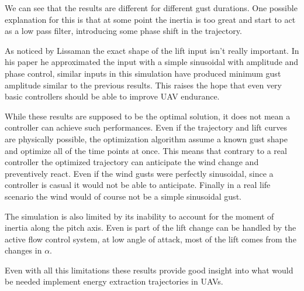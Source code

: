 \FloatBarrier

\par We can see that the results are different for different gust durations.
One possible explanation for this is that at some point the inertia is too great and start to act as a low pass filter, introducing some phase shift in the trajectory. 





\par As noticed by Lissaman the exact shape of the lift input isn't really important.
In his paper he approximated the input with a simple sinusoidal with amplitude and phase control, similar inputs in this simulation have produced minimum gust amplitude similar to the previous results.
This raises the hope that even very basic controllers should be able to improve UAV endurance.


\par While these results are supposed to be the optimal solution, it does not mean a controller can achieve such performances.
Even if the trajectory and lift curves are physically possible, the optimization algorithm assume a known gust shape and optimize all of the time points at once.
This means that contrary to a real controller the optimized trajectory can anticipate the wind change and preventively react.
Even if the wind gusts were perfectly sinusoidal, since a controller is casual it would not be able to anticipate.
Finally in a real life scenario the wind would of course not be a simple sinusoidal gust.

\par The simulation is also limited by its inability to account for the moment of inertia along the pitch axis.
Even is part of the lift change can be handled by the active flow control system, at low angle of attack, most of the lift comes from the changes in $\alpha$.

\par Even with all this limitations these results provide good insight into what would be needed implement energy extraction trajectories in UAVs.


